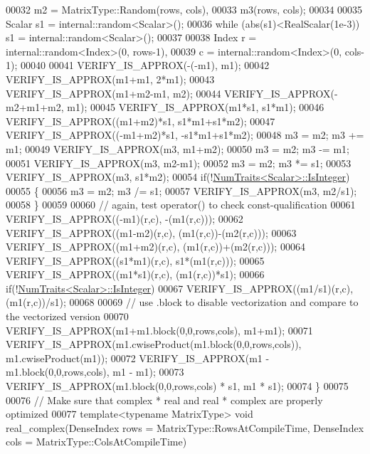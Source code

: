 \begin{DoxyCode}
00032              m2 = MatrixType::Random(rows, cols),
00033              m3(rows, cols);
00034 
00035   Scalar s1 = internal::random<Scalar>();
00036   \textcolor{keywordflow}{while} (abs(s1)<RealScalar(1e-3)) s1 = internal::random<Scalar>();
00037 
00038   Index r = internal::random<Index>(0, rows-1),
00039         c = internal::random<Index>(0, cols-1);
00040 
00041   VERIFY\_IS\_APPROX(-(-m1),                  m1);
00042   VERIFY\_IS\_APPROX(m1+m1,                   2*m1);
00043   VERIFY\_IS\_APPROX(m1+m2-m1,                m2);
00044   VERIFY\_IS\_APPROX(-m2+m1+m2,               m1);
00045   VERIFY\_IS\_APPROX(m1*s1,                   s1*m1);
00046   VERIFY\_IS\_APPROX((m1+m2)*s1,              s1*m1+s1*m2);
00047   VERIFY\_IS\_APPROX((-m1+m2)*s1,             -s1*m1+s1*m2);
00048   m3 = m2; m3 += m1;
00049   VERIFY\_IS\_APPROX(m3,                      m1+m2);
00050   m3 = m2; m3 -= m1;
00051   VERIFY\_IS\_APPROX(m3,                      m2-m1);
00052   m3 = m2; m3 *= s1;
00053   VERIFY\_IS\_APPROX(m3,                      s1*m2);
00054   \textcolor{keywordflow}{if}(!\hyperlink{group___core___module_struct_eigen_1_1_num_traits}{NumTraits<Scalar>::IsInteger})
00055   \{
00056     m3 = m2; m3 /= s1;
00057     VERIFY\_IS\_APPROX(m3,                    m2/s1);
00058   \}
00059 
00060   \textcolor{comment}{// again, test operator() to check const-qualification}
00061   VERIFY\_IS\_APPROX((-m1)(r,c), -(m1(r,c)));
00062   VERIFY\_IS\_APPROX((m1-m2)(r,c), (m1(r,c))-(m2(r,c)));
00063   VERIFY\_IS\_APPROX((m1+m2)(r,c), (m1(r,c))+(m2(r,c)));
00064   VERIFY\_IS\_APPROX((s1*m1)(r,c), s1*(m1(r,c)));
00065   VERIFY\_IS\_APPROX((m1*s1)(r,c), (m1(r,c))*s1);
00066   \textcolor{keywordflow}{if}(!\hyperlink{group___core___module_struct_eigen_1_1_num_traits}{NumTraits<Scalar>::IsInteger})
00067     VERIFY\_IS\_APPROX((m1/s1)(r,c), (m1(r,c))/s1);
00068 
00069   \textcolor{comment}{// use .block to disable vectorization and compare to the vectorized version}
00070   VERIFY\_IS\_APPROX(m1+m1.block(0,0,rows,cols), m1+m1);
00071   VERIFY\_IS\_APPROX(m1.cwiseProduct(m1.block(0,0,rows,cols)), m1.cwiseProduct(m1));
00072   VERIFY\_IS\_APPROX(m1 - m1.block(0,0,rows,cols), m1 - m1);
00073   VERIFY\_IS\_APPROX(m1.block(0,0,rows,cols) * s1, m1 * s1);
00074 \}
00075 
00076 \textcolor{comment}{// Make sure that complex * real and real * complex are properly optimized}
00077 \textcolor{keyword}{template}<\textcolor{keyword}{typename} MatrixType> \textcolor{keywordtype}{void} real\_complex(DenseIndex rows = MatrixType::RowsAtCompileTime, DenseIndex
       cols = MatrixType::ColsAtCompileTime)

\end{DoxyCode}
